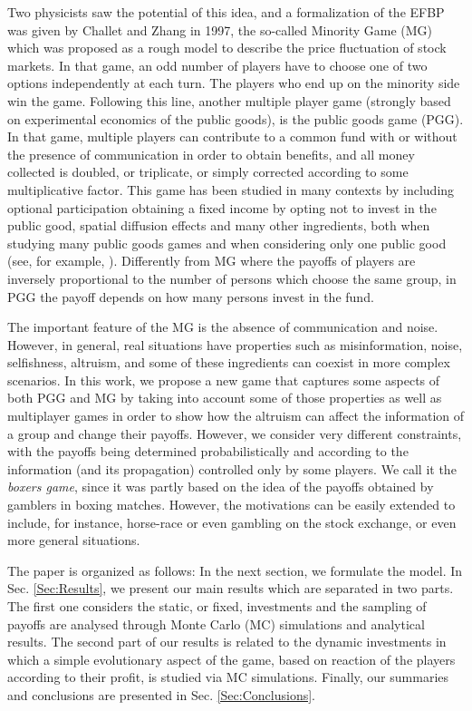 \documentclass[3p, 11pt]{elsarticle}
\begin{document}
Two physicists saw the potential of this idea, and a formalization of the
EFBP was given by Challet and Zhang \cite{Challet1997} in 1997, the
so-called Minority Game (MG) which was proposed as a rough model to describe
the price fluctuation of stock markets. In that game, an odd number of
players have to choose one of two options independently at each turn. The
players who end up on the minority side win the game. Following this line,
another multiple player game (strongly based on experimental economics of
the public goods), is the public goods game (PGG). In that game, multiple
players can contribute to a common fund with or without the presence of
communication in order to obtain benefits, and all money collected is
doubled, or triplicate, or simply corrected according to some multiplicative
factor. This game has been studied in many contexts by including optional
participation obtaining a fixed income by opting not to invest in the public
good, spatial diffusion effects and many other ingredients, both when
studying many public goods games \cite%
{Szabo2002,Hauert2003,Hauertetal2002,Pablo2017} and when considering only
one public good (see, for example, \cite%
{SilvaIJBC2010,SilvaBJP2008,SilvaLNE2006, SilvaPhysA2006}). Differently from
MG where the payoffs of players are inversely proportional to the number of
persons which choose the same group, in PGG the payoff depends on how many
persons invest in the fund.

The important feature of the MG is the absence of communication and noise.
However, in general, real situations have properties such as misinformation,
noise, selfishness, altruism, and some of these ingredients can coexist in
more complex scenarios. In this work, we propose a new game that captures
some aspects of both PGG and MG by taking into account some of those
properties as well as multiplayer games in order to show how the altruism
can affect the information of a group and change their payoffs. However, we
consider very different constraints, with the payoffs being determined
probabilistically and according to the information (and its propagation)
controlled only by some players. We call it the \textit{boxers game}, since
it was partly based on the idea of the payoffs obtained by gamblers in
boxing matches. However, the motivations can be easily extended to include,
for instance, horse-race or even gambling on the stock exchange, or even
more general situations.

The paper is organized as follows: In the next section, we formulate the
model. In Sec. \ref{Sec:Results}, we present our main results which are
separated in two parts. The first one considers the static, or fixed,
investments and the sampling of payoffs are analysed through Monte Carlo
(MC) simulations and analytical results. The second part of our results is
related to the dynamic investments in which a simple evolutionary aspect of
the game, based on reaction of the players according to their profit, is
studied via MC simulations. Finally, our summaries and conclusions are
presented in Sec. \ref{Sec:Conclusions}.
\end{document}
